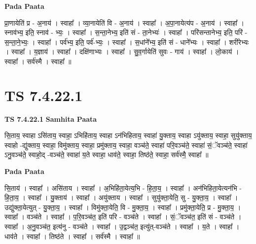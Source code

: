 \documentclass[17pt]{extarticle}
\begin{document}
\textbf{Pada Paata} \newline

प्रा॒णायेति॑ प्र - अ॒नाय॑ । स्वाहा᳚ । व्या॒नायेति॑ वि - अ॒नाय॑ । स्वाहा᳚ । अ॒पा॒नायेत्य॑प - अ॒नाय॑ । स्वाहा᳚ । स्नाव॑भ्य॒ इति॒ स्नाव॑ - भ्यः॒ । स्वाहा᳚ । स॒न्ता॒नेभ्य॒ इति॑ सं - ता॒नेभ्यः॑ । स्वाहा᳚ । परि॑सन्तानेभ्य॒ इति॒ परि॑ - स॒न्ता॒ने॒भ्यः॒ । स्वाहा᳚ । पर्व॑भ्य॒ इति॒ पर्व॑-भ्यः॒ । स्वाहा᳚ । स॒धांने᳚भ्य॒ इति॑ सं - धाने᳚भ्यः । स्वाहा᳚ । शरी॑रेभ्यः । स्वाहा᳚ । य॒ज्ञाय॑ । स्वाहा᳚ । दक्षि॑णाभ्यः । स्वाहा᳚ । सु॒व॒र्गायेति॑ सुवः - गाय॑ । स्वाहा᳚ । लो॒काय॑ । स्वाहा᳚ । सर्व॑स्मै । स्वाहा᳚ ॥  \newline




\section*{ TS 7.4.22.1 }

\textbf{TS 7.4.22.1 } \newline
\textbf{Samhita Paata} \newline

सि॒ताय॒ स्वाहा ऽसि॑ताय॒ स्वाहा॒ ऽभिहि॑ताय॒ स्वाहा ऽन॑भिहिताय॒ स्वाहा॑ यु॒क्ताय॒ स्वाहा ऽयु॑क्ताय॒ स्वाहा॒ सुयु॑क्ताय॒ स्वाहो -द्यु॑क्ताय॒ स्वाहा॒ विमु॑क्ताय॒ स्वाहा॒ प्रमु॑क्ताय॒ स्वाहा॒ वञ्च॑ते॒ स्वाहा॑ परि॒वञ्च॑ते॒ स्वाहा॑ सं॒ॅवञ्च॑ते॒ स्वाहा॑ ऽनु॒वञ्च॑ते॒ स्वाहो॒द् -वञ्च॑ते॒ स्वाहा॑ य॒ते स्वाहा॒ धाव॑ते॒ स्वाहा॒ तिष्ठ॑ते॒ स्वाहा॒ सर्व॑स्मै॒ स्वाहा᳚ ॥ \newline

\textbf{Pada Paata} \newline

सि॒ताय॑ । स्वाहा᳚ । असि॑ताय । स्वाहा᳚ । अ॒भिहि॑ता॒येत्य॒भि - हि॒ता॒य॒ । स्वाहा᳚ । अन॑भिहिता॒येत्यन॑भि - हि॒ता॒य॒ । स्वाहा᳚ । यु॒क्ताय॑ । स्वाहा᳚ । अयु॑क्ताय । स्वाहा᳚ । सुयु॑क्ता॒येति॒ सु - यु॒क्ता॒य॒ । स्वाहा᳚ । उद्यु॑क्ता॒येत्युत् - यु॒क्ता॒य॒ । स्वाहा᳚ । विमु॑क्ता॒येति॒ वि - मु॒क्ता॒य॒ । स्वाहा᳚ । प्रमु॑क्ता॒येति॒ प्र - मु॒क्ता॒य॒ । स्वाहा᳚ । वञ्च॑ते । स्वाहा᳚ । प॒रि॒वञ्च॑त॒ इति॑ परि - वञ्च॑ते । स्वाहा᳚ । सं॒ॅवञ्च॑त॒ इति॑ सं - वञ्च॑ते । स्वाहा᳚ । अ॒नु॒वञ्च॑त॒ इत्य॑नु - वञ्च॑ते । स्वाहा᳚ । उ॒द्वञ्च॑त॒ इत्यु॑त्-वञ्च॑ते । स्वाहा᳚ । य॒ते । स्वाहा᳚ । धाव॑ते । स्वाहा᳚ । तिष्ठ॑ते । स्वाहा᳚ । सर्व॑स्मै । स्वाहा᳚ ॥  \newline
\end{document}
